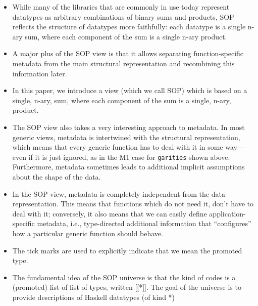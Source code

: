 \begin{itemize}
    \item While many of the libraries that are
    commonly in use today represent datatypes as arbitrary combinations of binary sums and products, SOP reflects the structure of datatypes more faithfully: each datatype is a single n-ary sum, where each component of the sum is a single n-ary product.
    \item A major plus of the SOP view is that it allows separating function-specific metadata from the main structural representation and recombining this information later.
    \item In this paper, we introduce a view (which we call SOP) which is based on a single, n-ary, sum, where each component of the sum is a single, n-ary, product.
    \item The SOP view also takes a very interesting approach to metadata. In most generic views, metadata is intertwined with the structural representation, which means that every generic function has to deal with it in some way—even if it is just ignored, as in the M1 case for \texttt{garities} shown above. Furthermore, metadata sometimes leads to additional implicit assumptions about the shape of the data.
    \item In the SOP view, metadata is completely independent from the data representation. This means that functions which do not need it, don't have to deal with it; conversely, it also means that we can easily define application-specific metadata, i.e., type-directed additional information that “configures” how a particular generic function should behave.
    \item The tick marks are used to explicitly indicate that we mean the promoted type.
    \item The fundamental idea of the SOP universe is that the kind of codes is a (promoted) list of list of types, written [[*]]. The goal of the universe is to provide descriptions of Haskell datatypes (of kind *)
\end{itemize}

